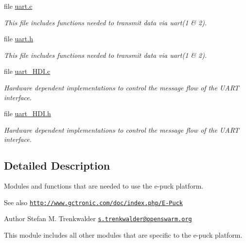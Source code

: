 \begin{DoxyCompactItemize}
file \hyperlink{uart_8c}{uart.\+c}
\begin{DoxyCompactList}\small\item\em This file includes functions needed to transmit data via uart(1 \& 2). \end{DoxyCompactList}\item 
file \hyperlink{uart_8h}{uart.\+h}
\begin{DoxyCompactList}\small\item\em This file includes functions needed to transmit data via uart(1 \& 2). \end{DoxyCompactList}\item 
file \hyperlink{uart__HDI_8c}{uart\+\_\+\+H\+D\+I.\+c}
\begin{DoxyCompactList}\small\item\em Hardware dependent implementations to control the message flow of the U\+A\+R\+T interface. \end{DoxyCompactList}\item 
file \hyperlink{uart__HDI_8h}{uart\+\_\+\+H\+D\+I.\+h}
\begin{DoxyCompactList}\small\item\em Hardware dependent implementations to control the message flow of the U\+A\+R\+T interface. \end{DoxyCompactList}\end{DoxyCompactItemize}


\subsection{Detailed Description}
Modules and functions that are needed to use the e-\/puck platform. 

\begin{DoxySeeAlso}{See also}
\href{http://www.gctronic.com/doc/index.php/E-Puck}{\tt http\+://www.\+gctronic.\+com/doc/index.\+php/\+E-\/\+Puck}
\end{DoxySeeAlso}
\begin{DoxyAuthor}{Author}
Stefan M. Trenkwalder \href{mailto:s.trenkwalder@openswarm.org}{\tt s.\+trenkwalder@openswarm.\+org}
\end{DoxyAuthor}
This module includes all other modules that are specific to the e-\/puck platform.


